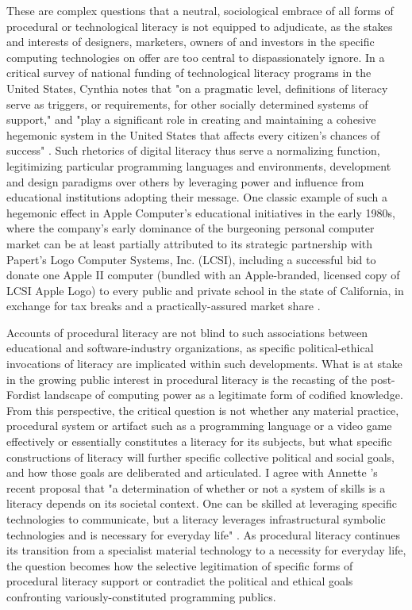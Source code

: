 These are complex questions that a neutral, sociological embrace of all forms of procedural or technological literacy is not equipped to adjudicate, as the stakes and interests of designers, marketers, owners of and investors in the specific computing technologies on offer are too central to dispassionately ignore. In a critical survey of national funding of technological literacy programs in the United States, Cynthia \citeauthor{Selfe1999} notes that "on a pragmatic level, definitions of literacy serve as triggers, or requirements, for other socially determined systems of support," and "play a significant role in creating and maintaining a cohesive hegemonic system in the United States that affects every citizen's chances of success" \autocite[18]{Selfe1999}. Such rhetorics of digital literacy thus serve a normalizing function, legitimizing particular programming languages and environments, development and design paradigms over others by leveraging power and influence from educational institutions adopting their message. One classic example of such a hegemonic effect in Apple Computer's educational initiatives in the early 1980s, where the company's early dominance of the burgeoning personal computer market can be at least partially attributed to its strategic partnership with Papert's Logo Computer Systems, Inc. (LCSI), including a successful bid to donate one Apple II computer (bundled with an Apple-branded, licensed copy of LCSI Apple Logo) to every public and private school in the state of California, in exchange for tax breaks and a practically-assured market share \autocite{Blakeslee84}.

Accounts of procedural literacy are not blind to such associations between educational and software-industry organizations, as specific political-ethical invocations of literacy are implicated within such developments. What is at stake in the growing public interest in procedural literacy is the recasting of the post-Fordist landscape of computing power as a legitimate form of codified knowledge. From this perspective, the critical question is not whether any material practice, procedural system or artifact such as a programming language or a video game effectively or essentially constitutes a literacy for its subjects, but what specific constructions of literacy will further specific collective political and social goals, and how those goals are deliberated and articulated. I agree with Annette \citeauthor{Vee2013-bh}'s recent proposal that "a determination of whether or not a system of skills is a literacy depends on its societal context. One can be skilled at leveraging specific technologies to communicate, but a literacy leverages infrastructural symbolic technologies and is necessary for everyday life" \autocite[45]{Vee2013-bh}. As procedural literacy continues its transition from a specialist material technology to a necessity for everyday life, the question becomes how the selective legitimation of specific forms of procedural literacy support or contradict the political and ethical goals confronting variously-constituted programming publics. 

